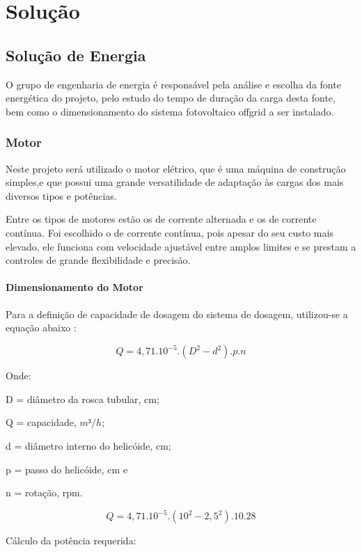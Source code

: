 \chapter[Solução]{Solução}\label{cap2}

\section{Solução de Energia}
O grupo de engenharia de energia é responsável pela análise e escolha da fonte energética do projeto, pelo estudo do tempo de duração da carga desta fonte, bem como o dimensionamento do sistema fotovoltaico offgrid a ser instalado.


\subsection{Motor}
Neste projeto será utilizado o motor elétrico, que é uma máquina de construção simples,e que possui uma grande versatilidade de adaptação às cargas dos mais diversos tipos e potências.

Entre os tipos de motores estão os de corrente alternada e os de corrente contínua. Foi escolhido o de corrente contínua, pois apesar do seu custo mais elevado, ele funciona com velocidade ajustável entre amplos limites e se prestam a controles de grande flexibilidade e precisão.

\subsubsection{Dimensionamento do Motor}

Para a definição de capacidade de dosagem do sistema de dosagem, utilizou-se a equação abaixo \cite{agricola}:

\begin{equation}
Q=4,71.10^{-5}.(D^{2}-d^{2}).p.n
\end{equation}

Onde:


D = diâmetro da rosca tubular, cm;

Q = capacidade, $m³/h$;

d = diâmetro interno do helicóide, cm;

p = passo do helicóide, cm e

n = rotação, rpm.

\begin{equation}
Q=4,71.10^{-5}.(10^{2}-2,5^{2}).10.28
\end{equation}

Cálculo da potência requerida:


